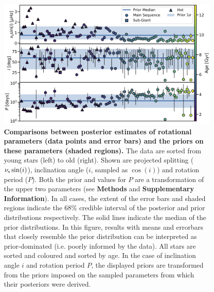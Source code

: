 \documentclass[12pt]{article}
\begin{document}
\begin{figure}
	\centering
	\includegraphics[width=\textwidth]{Images/priors.jpg}
	\caption{\textbf{Comparisons between posterior estimates of rotational parameters (data points and error bars) and the priors on these parameters (shaded regions).} The data are sorted from young stars (left) to old (right). Shown are projected splitting ($\nu_{\rm s}\sin(i)$), inclination angle ($i$, sampled as $\cos(i)$) and rotation period ($P$). Both the prior and values for $P$ are a transformation of the upper two parameters (see \textbf{Methods} and \textbf{Supplementary Information}). In all cases, the extent of the error bars and shaded regions indicate the 68\% credible interval of the posterior and prior distributions respectively. The solid lines indicate the median of the prior distributions. In this figure, results with means and errorbars that closely resemble the prior distribution can be interpreted as prior-dominated (i.e. poorly informed by the data). All stars are sorted and coloured and sorted by age. In the case of inclination angle $i$ and rotation period $P$, the displayed priors are transformed from the priors imposed on the sampled parameters from which their posteriors were derived.}
	\label{fig:priors}
\end{figure}
\end{document}
